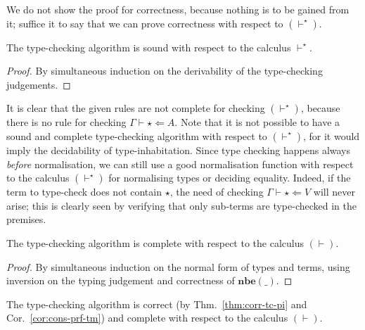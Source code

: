 \documentclass{LMCS}
\theoremstyle{plain}\newtheorem{satz}[thm]{Satz}
\newcommand{\LONGVERSION}[1]{#1}
\newcommand{\SHORTVERSION}[1]{}
\newcommand{\boxty}[1]{[#1]}
\newcommand{\vdashp}{\vdash^{\oprf}}\newcommand{\sdctx}[1]{#1\vdashp}
\newcommand{\chkterm}[3]{#1\vdash#3\Leftarrow #2}
\newcommand{\norm}[1]{\mathbf{nbe}(#1)}
\newcommand{\ruleref}[1]{(\RefTirName{#1})}
\newcommand{\oprf}{\dprf}
\newcommand{\dprf}{\star}
\renewcommand{\boxty}[1]{\mathsf{Prf}\,#1}
\newcommand{\LONGVERSION}[1]{}
\newcommand{\SHORTVERSION}[1]{#1}
\newcommand{\LONGSHORT}[2]{\LONGVERSION{#1}\SHORTVERSION{#2}}
\begin{document}
\LONGSHORT{

\noindent  We do not show the proof for correctness, because nothing is to be
  gained from it; suffice it to say that we can prove correctness with
  respect to $(\vdashp)$.

\begin{thm}
\label{thm:corr-tc-pi}
  The type-checking algorithm is sound with respect to the calculus
  $\vdashp$.
\end{thm}  
\begin{proof}
  By simultaneous induction on the derivability of the type-checking
  judgements.
\end{proof}


It is clear that the given rules are not complete for checking
$(\vdashp)$, because there is no rule for checking
$\chkterm{\Gamma}{A}{\oprf}$. Note that it is not possible to have a
sound and complete type-checking algorithm with respect to
$(\vdashp)$, for it would imply the decidability of
type-inhabitation. Since type checking happens always \emph{before}
normalisation, we can still use a good normalisation function with
respect to the calculus $(\vdashp)$ for normalising types or deciding
equality. Indeed, if the term to type-check does not contain $\oprf$,
the need of checking $\chkterm{\Gamma}{V}{\oprf}$ will never arise;
this is clearly seen by verifying that only sub-terms are
type-checked in the premises.

\begin{thm}
  The type-checking algorithm is complete with respect to the calculus
  $(\vdash)$.
\end{thm}  
\begin{proof}
  By simultaneous induction on the normal form of types and terms,
  using inversion on the typing judgement and correctness of $\norm{\_}$.
\end{proof}

}{ \begin{rem}
    Thm.~\ref{thm:corr-tc} is still valid for the calculus with
    \ruleref{prf-tm}. Moreover, Thm.~\ref{thm:compl-tc} is valid if
    we add the axiom $\chkterm{\Gamma}{\boxty{V}}{\oprf}.$
  \end{rem}
}



\begin{cor}
  The type-checking algorithm is correct (by Thm.~\ref{thm:corr-tc-pi}
  and Cor.~\ref{cor:cons-prf-tm}) and complete with respect to the
  calculus $(\vdash)$. \end{cor}
\end{document}
